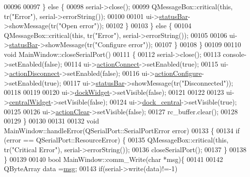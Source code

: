\begin{DoxyCode}
{00096 
00097         \} \textcolor{keywordflow}{else} \{
00098             serial->close();
00099             QMessageBox::critical(\textcolor{keyword}{this}, tr(\textcolor{stringliteral}{"Error"}), serial->errorString());
00100 
00101             ui->\hyperlink{a00080_a50fa481337604bcc8bf68de18ab16ecd}{statusBar}->showMessage(tr(\textcolor{stringliteral}{"Open error"}));
00102         \}
00103     \} \textcolor{keywordflow}{else} \{
00104         QMessageBox::critical(\textcolor{keyword}{this}, tr(\textcolor{stringliteral}{"Error"}), serial->errorString());
00105 
00106         ui->\hyperlink{a00080_a50fa481337604bcc8bf68de18ab16ecd}{statusBar}->showMessage(tr(\textcolor{stringliteral}{"Configure error"}));
00107     \}
00108 \}
00109 
00110 \textcolor{keywordtype}{void} MainWindow::closeSerialPort()
00111 \{
00112     serial->close();
00113     console->setEnabled(\textcolor{keyword}{false});
00114     ui->\hyperlink{a00080_aa0785566311fc48271690fb68b1d4c5f}{actionConnect}->setEnabled(\textcolor{keyword}{true});
00115     ui->\hyperlink{a00080_a8a16b3aef75b279eaaa887152d2f746b}{actionDisconnect}->setEnabled(\textcolor{keyword}{false});
00116     ui->\hyperlink{a00080_a3860abde3cfd3f6170e28fddde73f11e}{actionConfigure}->setEnabled(\textcolor{keyword}{true});
00117     ui->\hyperlink{a00080_a50fa481337604bcc8bf68de18ab16ecd}{statusBar}->showMessage(tr(\textcolor{stringliteral}{"Disconnected"}));
00118 
00119 
00120     ui->\hyperlink{a00080_ac8a083c4b66fb317a9b538409ce412e2}{dockWidget}->setVisible(\textcolor{keyword}{false});
00121 
00122 
00123    ui->\hyperlink{a00080_a30075506c2116c3ed4ff25e07ae75f81}{centralWidget}->setVisible(\textcolor{keyword}{false});
00124    ui->\hyperlink{a00080_a19105d0d919fa33b5f29f7677bbab054}{dock\_central}->setVisible(\textcolor{keyword}{true});
00125 
00126    ui->\hyperlink{a00080_ac8539dcd87955047877cb256aff60453}{actionClear}->setVisible(\textcolor{keyword}{false});
00127       rc\_buffer.clear();
00128 
00129 \}
00130 
00131 
00132 \textcolor{keywordtype}{void} MainWindow::handleError(QSerialPort::SerialPortError error)
00133 \{
00134     \textcolor{keywordflow}{if} (error == QSerialPort::ResourceError) \{
00135         QMessageBox::critical(\textcolor{keyword}{this}, tr(\textcolor{stringliteral}{"Critical Error"}), serial->errorString());
00136         closeSerialPort();
00137     \}
00138 \}
00139 
00140 \textcolor{keywordtype}{bool} MainWindow::comm\_Write(\textcolor{keywordtype}{char} *msg)\{
00141 
00142     QByteArray data =\hyperlink{a00017_a6134b74dbfffbaf333e169bd09597b53}{msg};
00143     \textcolor{keywordflow}{if}(serial->write(data)!=-1)
}
\end{DoxyCode}
